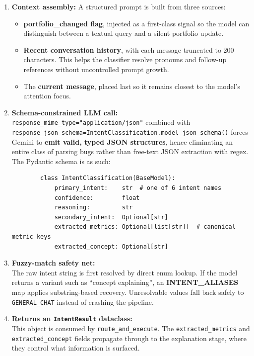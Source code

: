 \begin{enumerate}
    \item \textbf{Context assembly:}
     A structured prompt is built from three sources:


    \begin{itemize}
        \item \textbf{portfolio\_changed flag}, injected as a first-class signal so the model can distinguish between a textual query and a silent portfolio update.
        
        \item \textbf{Recent conversation history}, with each message truncated to 200 characters. This helps the classifier resolve pronouns and follow-up references without uncontrolled prompt growth.
        
        \item The \textbf{current message}, placed last so it remains closest to the model's attention focus.
    \end{itemize}

    \item \textbf{Schema-constrained LLM call:}\\
    \texttt{response\_mime\_type="application/json"} combined with\\ \texttt{response\_json\_schema=IntentClassification.model\_json\_schema()} forces Gemini to \textbf{emit valid, typed JSON structures}, hence eliminating an entire class of parsing bugs rather than free-text JSON extraction with regex. The Pydantic schema is as such:\\

    \begin{lstlisting}
        class IntentClassification(BaseModel):
            primary_intent:    str  # one of 6 intent names
            confidence:        float
            reasoning:         str
            secondary_intent:  Optional[str]
            extracted_metrics: Optional[list[str]]  # canonical metric keys
            extracted_concept: Optional[str]
    \end{lstlisting}

    \item \textbf{Fuzzy-match safety net:}\\
    The raw intent string is first resolved by direct enum lookup. If the model returns a variant such as “concept explaining”, an \textbf{INTENT\_ALIASES} map applies substring-based recovery. Unresolvable values fall back safely to \texttt{GENERAL\_CHAT} instead of crashing the pipeline.

    \item \textbf{Returns an \texttt{IntentResult} dataclass:}\\
    This object is consumed by \texttt{route\_and\_execute}. The \texttt{extracted\_metrics} and \texttt{extracted\_concept} fields propagate through to the explanation stage, where they control what information is surfaced.

\end{enumerate}


